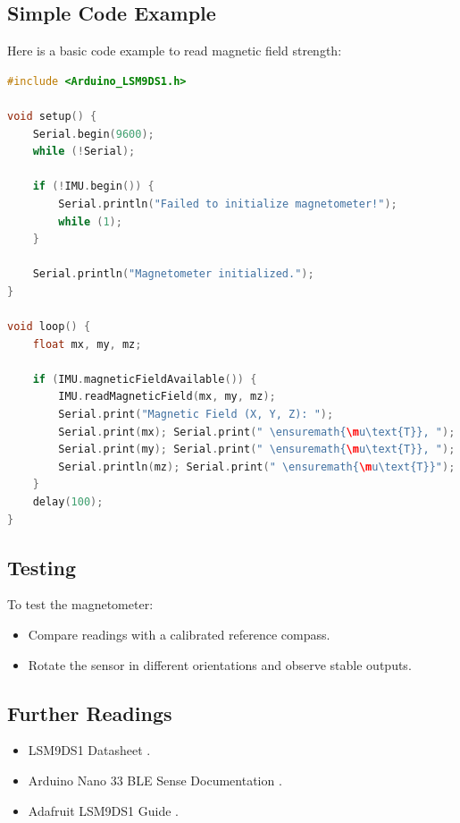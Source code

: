 \subsection{Simple Code Example}
Here is a basic code example to read magnetic field strength:
\begin{lstlisting}[language=C++, caption=Magnetometer Simple Code]
#include <Arduino_LSM9DS1.h>

void setup() {
    Serial.begin(9600);
    while (!Serial);

    if (!IMU.begin()) {
        Serial.println("Failed to initialize magnetometer!");
        while (1);
    }

    Serial.println("Magnetometer initialized.");
}

void loop() {
    float mx, my, mz;

    if (IMU.magneticFieldAvailable()) {
        IMU.readMagneticField(mx, my, mz);
        Serial.print("Magnetic Field (X, Y, Z): ");
        Serial.print(mx); Serial.print(" \ensuremath{\mu\text{T}}, ");
        Serial.print(my); Serial.print(" \ensuremath{\mu\text{T}}, ");
        Serial.println(mz); Serial.print(" \ensuremath{\mu\text{T}}");
    }
    delay(100);
}
\end{lstlisting}

\subsection{Testing}
To test the magnetometer:
\begin{itemize}
    \item Compare readings with a calibrated reference compass.
    \item Rotate the sensor in different orientations and observe stable outputs.
\end{itemize}

\subsection{Further Readings}
\begin{itemize}
    \item LSM9DS1 Datasheet \cite{STM:2015}.
    \item Arduino Nano 33 BLE Sense Documentation \cite{ArduinoNano33Sense2025}.
    \item Adafruit LSM9DS1 Guide \cite{AdafruitLSM9DS1}.
\end{itemize}
